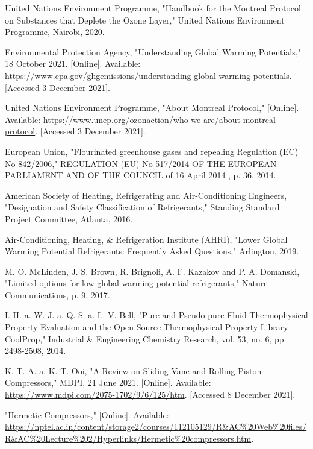 \documentclass{ucalgarythesis}
\begin{document}
\begin{thebibliography}{9}
     United Nations Environment Programme, "Handbook for the Montreal Protocol on Substances that Deplete the Ozone Layer," United Nations Environment Programme, Nairobi, 2020.
    
     Environmental Protection Agency, "Understanding Global Warming Potentials," 18 October 2021. [Online]. Available: \url{https://www.epa.gov/ghgemissions/understanding-global-warming-potentials}. [Accessed 3 December 2021].
    
     United Nations Environment Programme, "About Montreal Protocol," [Online]. Available: \url{https://www.unep.org/ozonaction/who-we-are/about-montreal-protocol}. [Accessed 3 December 2021].

     European Union, "Flourinated greenhouse gases and repealing Regulation (EC) No 842/2006," REGULATION (EU) No 517/2014 OF THE EUROPEAN PARLIAMENT AND OF THE COUNCIL of 16 April 2014 , p. 36, 2014. 

     American Society of Heating, Refrigerating and Air-Conditioning Engineers, "Designation and Safety Classification of Refrigerants," Standing Standard Project Committee, Atlanta, 2016.

     Air-Conditioning, Heating, \& Refrigeration Institute (AHRI), "Lower Global Warming Potential Refrigerants: Frequently Asked Questions," Arlington, 2019.

     M. O. McLinden, J. S. Brown, R. Brignoli, A. F. Kazakov and P. A. Domanski, "Limited options for low-global-warming-potential refrigerants," Nature Communications, p. 9, 2017.

     I. H. a. W. J. a. Q. S. a. L. V. Bell, "Pure and Pseudo-pure Fluid Thermophysical Property Evaluation and the Open-Source Thermophysical Property Library CoolProp," Industrial \& Engineering Chemistry Research, vol. 53, no. 6, pp. 2498-2508, 2014.

     K. T. A. a. K. T. Ooi, "A Review on Sliding Vane and Rolling Piston Compressors," MDPI, 21 June 2021. [Online]. Available: \url{https://www.mdpi.com/2075-1702/9/6/125/htm}. [Accessed 8 December 2021].

     "Hermetic Compressors," [Online]. Available: \url{https://nptel.ac.in/content/storage2/courses/112105129/R&AC\%20Web\%20files/R&AC\%20Lecture\%202/Hyperlinks/Hermetic\%20compressors.htm}.


\end{thebibliography}
\end{document}
